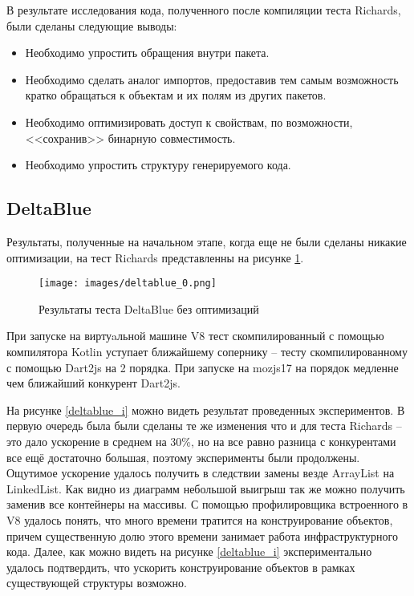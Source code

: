 В результате исследования кода, полученного после компиляции теста Richards, были сделаны следующие выводы:
\begin{itemize}
\item Необходимо упростить обращения внутри пакета.
\item Необходимо сделать аналог импортов, предоставив тем самым возможность кратко обращаться к объектам и их полям из других пакетов.
\item Необходимо оптимизировать доступ к свойствам, по возможности, <<сохранив>> бинарную совместимость.
\item Необходимо упростить структуру генерируемого кода.
\end{itemize}

\subsection{DeltaBlue}

Результаты, полученные на начальном этапе, когда еще не были сделаны никакие оптимизации, на тест Richards представленны на рисунке \ref{deltablue_0}.

\begin{figure}[ht!]
\centering
\texttt{[image: images/deltablue\_0.png]}
\caption{Результаты теста DeltaBlue без оптимизаций}
\label{deltablue_0}
\end{figure}

При запуске на виртуaльной машине V8 тест скомпилированный с помощью компилятора Kotlin уступает ближайшему сопернику -- тесту скомпилированному с помощью Dart2js на 2 порядка. При запуске на mozjs17 на порядок медленне чем ближайший конкурент Dart2js.

На рисунке \ref{deltablue_i} можно видеть результат проведенных экспериментов. В первую очередь была были сделаны те же изменения что и для теста Richards -- это дало ускорение в среднем на 30\%, но на все равно разница с конкурентами все ещё достаточно большая, поэтому эксперименты были продолжены. Ощутимое ускорение удалось получить в следствии замены везде ArrayList на LinkedList.
Как видно из диаграмм небольшой выигрыш так же можно получить заменив все контейнеры на массивы. С помощью профилировщика встроенного в V8 удалось понять, что много времени тратится на конструирование объектов, причем существенную долю этого времени занимает работа инфраструктурного кода. Далее, как можно видеть на рисунке \ref{deltablue_i} экспериментально удалось подтвердить, что ускорить конструирование объектов в рамках существующей структуры возможно.

